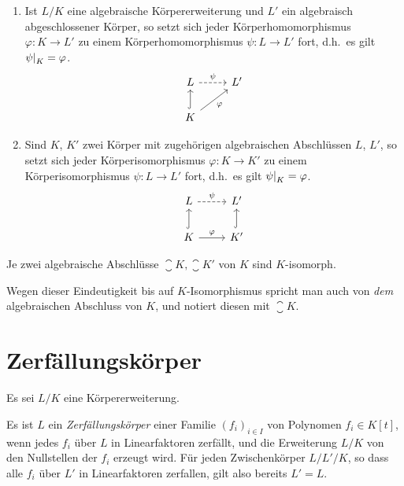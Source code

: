 \begin{lemma}
  \leavevmode
  \begin{enumerate}
    \item
      Ist $L/K$ eine algebraische Körpererweiterung und $L'$ ein algebraisch abgeschlossener Körper, so setzt sich jeder Körperhomomorphismus $\varphi \colon K \to L'$ zu einem Körperhomomorphismus $\psi \colon L \to L'$ fort, d.h.\ es gilt $\restrict{\psi}{K} = \varphi$.
      \[
        \begin{tikzcd}
            L
            \arrow[dashed]{r}[above]{\psi}
          & L'
          \\
            K
            \arrow[hook]{u}
            \arrow{ru}[below right]{\varphi}
          & {}
        \end{tikzcd}
      \]
    \item
      Sind $K$, $K'$ zwei Körper mit zugehörigen algebraischen Abschlüssen $L$, $L'$, so setzt sich jeder Körperisomorphismus $\varphi \colon K \to K'$ zu einem Körperisomorphismus $\psi \colon L \to L'$ fort, d.h.\ es gilt $\restrict{\psi}{K} = \varphi$.
      \[
        \begin{tikzcd}
            L
            \arrow[dashed]{r}[above]{\psi}
          & L'
          \\
            K
            \arrow[hook]{u}
            \arrow{r}[above]{\varphi}
          & K'
            \arrow[hook]{u}
        \end{tikzcd}
      \]
  \end{enumerate}
\end{lemma}


\begin{corollary}
  Je zwei algebraische Abschlüsse $\closure{K}, \closure{K}'$ von $K$ sind $K$-isomorph.
\end{corollary}

Wegen dieser Eindeutigkeit bis auf $K$-Isomorphismus spricht man auch von \emph{dem} algebraischen Abschluss von $K$, und notiert diesen mit $\closure{K}$.





\section{Zerfällungskörper}

Es sei $L/K$ eine Körpererweiterung.

\begin{definition}
  Es ist $L$ ein \emph{Zerfällungskörper} einer Familie $(f_i)_{i \in I}$ von Polynomen $f_i \in K[t]$, wenn jedes $f_i$ über $L$ in Linearfaktoren zerfällt, und die Erweiterung $L/K$ von den Nullstellen der $f_i$ erzeugt wird.
  Für jeden Zwischenkörper $L/L'/K$, so dass alle $f_i$ über $L'$ in Linearfaktoren zerfallen, gilt also bereits $L' = L$.
\end{definition}

